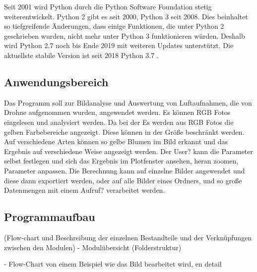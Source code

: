 
Seit 2001 wird Python durch die Python Software Foundation stetig weiterentwickelt. 
Python 2 gibt es seit 2000, Python 3 seit 2008. Dies beinhaltet so tiefgreifende Änderungen, dass einige Funktionen, die unter Python 2 geschrieben wurden, nicht mehr unter Python 3 funktionieren würden. Deshalb wird Python 2.7 noch bis Ende 2019 mit weiteren Updates unterstützt. Die aktuellste stabile Version ist seit 2018 Python 3.7 \citep[vgl.][]{PSF2019}.


\subsection{Anwendungsbereich} %
Das Programm soll zur Bildanalyse und Auswertung von Luftaufnahmen, die von Drohne aufgenommen wurden, angewendet werden. Es können RGB Fotos eingelesen und analysiert werden. Da bei der 
Es werden aus RGB Fotos die gelben Farbebereiche angezeigt. Diese können in der Größe beschränkt werden. Auf verschiedene Arten können so gelbe Blumen im Bild erkannt und das Ergebnis auf verschiedene Weise angezeigt werden. Der User? kann die Parameter selbst festlegen und sich das Ergebnis im Plotfenster ansehen, heran zoomen, Parameter anpassen. Die Berechnung kann auf einzelne Bilder angewendet und diese dann exportiert werden, oder auf alle Bilder eines Ordners, und so große Datenmengen mit einem Aufruf? verarbeitet werden. 

\subsection{Programmaufbau}
(Flow-chart und Beschreibung der einzelnen Bestandteile und der Verknüpfungen zwischen den Modulen)
     - Modulübersicht (Folderstruktur)
    
    - Flow-Chart von einem Beispiel wie das Bild bearbeitet wird, en detail

